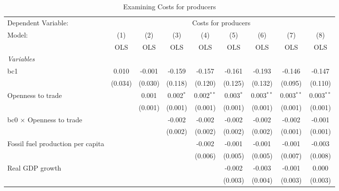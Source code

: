 
\begin{table}[htbp]
   \caption{Examining Costs for producers}
   \centering
   \begin{tabular}{lcccccccc}
      \toprule
      Dependent Variable: & \multicolumn{8}{c}{Costs for producers}\\
      Model:                                  & (1)     & (2)     & (3)         & (4)          & (5)         & (6)          & (7)          & (8)\\  
                                              &  OLS    & OLS     & OLS         & OLS          & OLS         & OLS          & OLS          & OLS\\  
      \midrule
      \emph{Variables}\\
      bc1                                     & 0.010   & -0.001  & -0.159      & -0.157       & -0.161      & -0.193       & -0.146       & -0.147\\   
                                              & (0.034) & (0.030) & (0.118)     & (0.120)      & (0.125)     & (0.132)      & (0.095)      & (0.110)\\   
      Openness to trade                       &         & 0.001   & 0.002$^{*}$ & 0.002$^{**}$ & 0.003$^{*}$ & 0.003$^{**}$ & 0.003$^{**}$ & 0.003$^{**}$\\   
                                              &         & (0.001) & (0.001)     & (0.001)      & (0.001)     & (0.001)      & (0.001)      & (0.001)\\   
      bc0 $\times$ Openness to trade          &         &         & -0.002      & -0.002       & -0.002      & -0.002       & -0.002       & -0.001\\   
                                              &         &         & (0.002)     & (0.002)      & (0.002)     & (0.002)      & (0.001)      & (0.001)\\   
      Fossil fuel production per capita       &         &         &             & -0.002       & -0.001      & -0.001       & -0.001       & -0.003\\   
                                              &         &         &             & (0.006)      & (0.005)     & (0.005)      & (0.007)      & (0.008)\\   
      Real GDP growth                         &         &         &             &              & -0.002      & -0.003       & -0.001       & 0.000\\   
                                              &         &         &             &              & (0.003)     & (0.004)      & (0.003)      & (0.003)\\   

\end{tabular}
\end{table}
